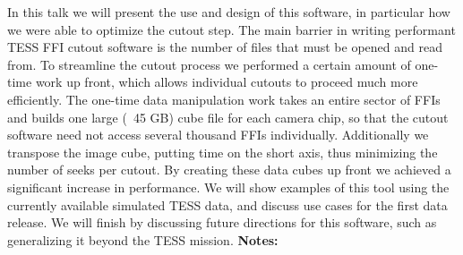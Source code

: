 \documentclass{report}
\begin{document}
{{{{{{{{{{{{{{{{{{{{{{{{{In this talk we will present the use and design of this software, in particular how we were able to optimize the cutout step. The main barrier in writing performant TESS FFI cutout software is the number of files that must be opened and read from. To streamline the cutout process we performed a certain amount of one-time work up front, which allows individual cutouts to proceed much more efficiently. The one-time data manipulation work takes an entire sector of FFIs and builds one large (~45 GB) cube file for each camera chip, so that the cutout software need not access several thousand FFIs individually.  Additionally we transpose the image cube, putting time on the short axis, thus minimizing the number of seeks per cutout. By creating these data cubes up front we achieved a significant increase in performance. We will show examples of this tool using the currently available simulated TESS data, and discuss use cases for the first data release. We will finish by discussing future directions for this software, such as generalizing it beyond the TESS mission.\newline
{\bf Notes:}\newline
{\newpage
}}}}}}}}}}}}}}}}}}}}}}}}}}
\end{document}
